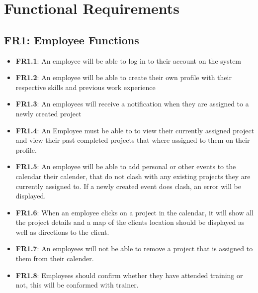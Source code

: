 \documentclass[]{article}
\begin{document}
\thispagestyle{empty}\selectfont	
	\tableofcontents
	\clearpage
	\section{Functional Requirements}
		\subsection{FR1: Employee Functions}
			\begin{itemize}
				\item \textbf{FR1.1}: An employee will be able to log in to their account on the system
				\item \textbf{FR1.2}: An employee will be able to create their own profile with their        respective skills and previous work experience
				\item \textbf{FR1.3}: An employees will receive a notification when they are assigned to a    newly created project 
				
				\item \textbf{FR1.4}: An Employee must be able to to view their currently assigned           project and view their past completed projects that where assigned        to them on their profile. 
				
				\item \textbf{FR1.5}: An employee will be able to add personal or other events to the        calendar their calender, that do not clash with any existing               projects they are currently assigned to. If a newly created event        does clash, an error will be displayed.  
				
				\item \textbf{FR1.6}: When an employee clicks on a project in the calendar, it will show     all the project details and a map of the clients location should be       displayed as well as directions to the client.
				
				\item \textbf{FR1.7}: An employees will not be able to remove a project that is assigned     to them from their calender.
				
				\item \textbf{FR1.8}: Employees should confirm whether they have attended training or not, this will be conformed with trainer.
			\end{itemize}
	
\end{document}
